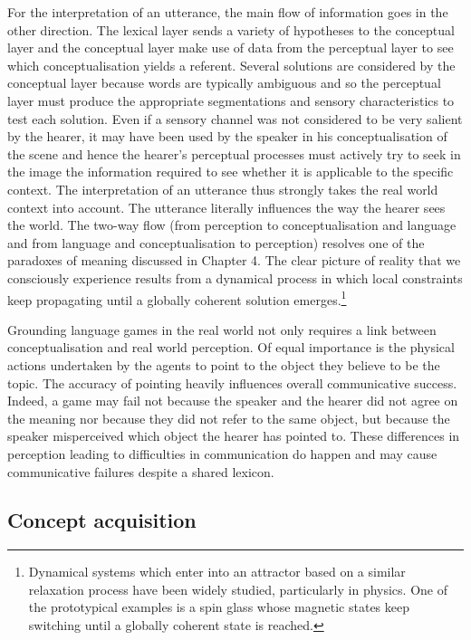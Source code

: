 For the interpretation of an utterance, the main 
flow of information goes in the other direction. The
lexical layer sends a variety of hypotheses to 
the conceptual layer and the conceptual layer make use of data 
from the perceptual layer to see which conceptualisation
yields a referent. Several solutions are considered 
by the conceptual layer because words are typically 
ambiguous and so the perceptual 
layer must produce the appropriate segmentations and 
sensory characteristics to test each solution.
Even if a sensory channel was not considered to be 
very salient by the hearer, it may have been 
used by the speaker in his conceptualisation of the 
scene and hence the hearer's perceptual 
processes must actively try to seek in the 
image the information required to see whether it 
is applicable to the specific
context. The interpretation of an utterance
thus strongly takes the real world context into account. 
The utterance literally influences the way the 
hearer sees the world. The two-way flow (from perception
to conceptualisation and language and from language
and conceptualisation to perception) resolves one of the 
paradoxes of meaning discussed in Chapter 4. The 
clear picture of reality that we consciously experience
results from a dynamical process in which local constraints 
keep propagating until a globally coherent solution
emerges.\footnote{Dynamical systems which enter into an attractor
based on a similar relaxation process have been 
widely studied, particularly in physics. One of the 
prototypical examples is a spin glass whose magnetic
states keep switching until a globally coherent
state is reached.}

Grounding language games in the real world
not only requires a link between conceptualisation
and real world perception. Of equal importance is the physical
actions undertaken by the agents to point to the object they 
believe to be the topic. The accuracy of pointing
heavily influences overall communicative success. Indeed, a
game may fail not because
the speaker and the hearer did not agree on the meaning
nor because they did not refer to the same object, but because the 
speaker misperceived which object the hearer has pointed to. 
These differences in perception leading to difficulties
in communication do happen and may 
cause communicative failures despite a shared lexicon. 

\subsection{Concept acquisition}

